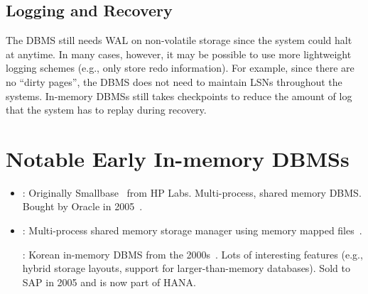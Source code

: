 \documentclass[11pt]{article}
\begin{document}
\subsection*{Logging and Recovery}
The DBMS still needs WAL on non-volatile storage since the system could halt at anytime.
In many cases, however, it may be possible to use more lightweight logging schemes (e.g., only 
store 
redo information). For example, since there are no ``dirty pages'', the DBMS does not need to 
maintain LSNs throughout the systems.
%         
In-memory DBMSs still takes checkpoints to reduce the amount of log that the system has to replay 
during recovery.
    
 
\section{Notable Early In-memory DBMSs}
\begin{itemize}
    \item {}:
    Originally Smallbase~\cite{heytens95} from HP Labs.
    Multi-process, shared memory DBMS.
    Bought by Oracle in 2005~\cite{lahiri13}.

    \item {}:
    Multi-process shared memory storage manager using memory mapped files~\cite{jagadish94}.
        
    :
    Korean in-memory DBMS from the 2000s~\cite{cha04}.
    Lots of interesting features (e.g., hybrid storage layouts, support for larger-than-memory 
    databases). Sold to SAP in 2005 and is now part of HANA.
\end{itemize}

\newpage


\end{document}

